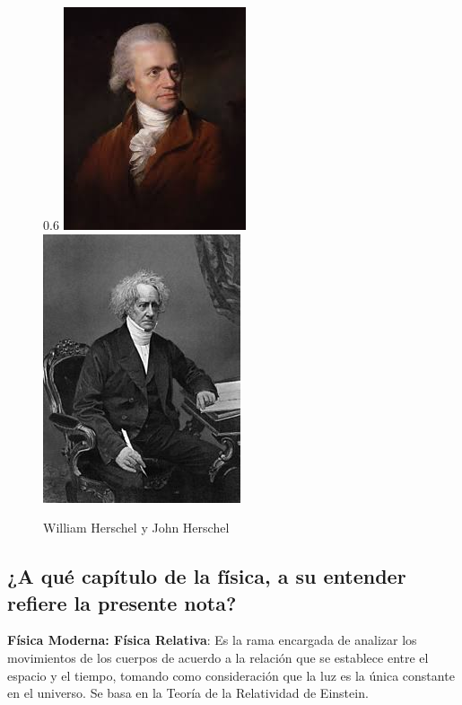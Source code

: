 \documentclass[11pt]{article}
\begin{document}
\begin{multicols}{2}
\begin{figure}{0.6\linewidth}
  \centering
  \includegraphics[width=0.6\linewidth]{william.jpeg}
  \includegraphics[width=0.6\linewidth]{john.jpg}
  \caption{William Herschel y John Herschel}
  
\end{figure}


\subsection{¿A qué capítulo de la física, a su entender refiere la presente nota?}
\label{sec:1}

\textbf{Física Moderna: Física Relativa}: Es la rama encargada de analizar los movimientos de los cuerpos de acuerdo a la relación que se establece entre el espacio y el tiempo, tomando como consideración que la luz es la única constante en el universo. Se basa en la Teoría de la Relatividad de Einstein. \cite{fisica}



\end{multicols}
\end{document}
